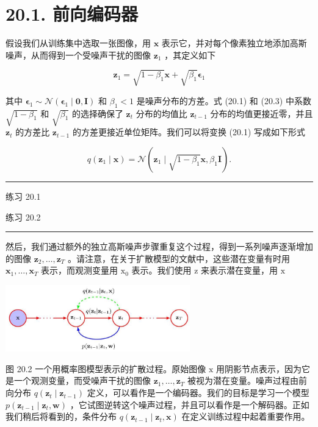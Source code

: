 \documentclass[10pt]{article}
\newcommand{\HRule}{\begin{center}\rule{0.9\linewidth}{0.2mm}\end{center}}
\begin{document}
\section*{20.1. 前向编码器}

假设我们从训练集中选取一张图像，用 \(\mathbf{x}\) 表示它，并对每个像素独立地添加高斯噪声，从而得到一个受噪声干扰的图像 \({\mathbf{z}}_{1}\) ，其定义如下

\[
{\mathbf{z}}_{1} = \sqrt{1 - {\beta }_{1}}\mathbf{x} + \sqrt{{\beta }_{1}}{\mathbf{\epsilon }}_{1} \tag{20.1}
\]

其中 \({\mathbf{\epsilon }}_{1} \sim  \mathcal{N}\left( {{\mathbf{\epsilon }}_{1} \mid  \mathbf{0},\mathbf{I}}\right)\) 和 \({\beta }_{1} < 1\) 是噪声分布的方差。式 (20.1) 和 (20.3) 中系数 \(\sqrt{1 - {\beta }_{1}}\) 和 \(\sqrt{{\beta }_{1}}\) 的选择确保了 \({\mathbf{z}}_{t}\) 分布的均值比 \({\mathbf{z}}_{t - 1}\) 分布的均值更接近零，并且 \({\mathbf{z}}_{t}\) 的方差比 \({\mathbf{z}}_{t - 1}\) 的方差更接近单位矩阵。我们可以将变换 (20.1) 写成如下形式

\[
q\left( {{\mathbf{z}}_{1} \mid  \mathbf{x}}\right)  = \mathcal{N}\left( {{\mathbf{z}}_{1} \mid  \sqrt{1 - {\beta }_{1}}\mathbf{x},{\beta }_{1}\mathbf{I}}\right) . \tag{20.2}
\]

\HRule

练习 20.1

练习 20.2

\HRule

然后，我们通过额外的独立高斯噪声步骤重复这个过程，得到一系列噪声逐渐增加的图像 \({\mathbf{z}}_{2},\ldots ,{\mathbf{z}}_{T}\) 。请注意，在关于扩散模型的文献中，这些潜在变量有时用 \({\mathbf{x}}_{1},\ldots ,{\mathbf{x}}_{T}\) 表示，而观测变量用 \({\mathrm{x}}_{0}\) 表示。我们使用 \(\mathrm{z}\) 来表示潜在变量，用 \(\mathrm{x}\)

\begin{center}
\includegraphics[max width=0.6\textwidth]{images/0194e279-9b28-703a-88f4-c3ac21e2010d_602_578_353_863_312_0.jpg}
\end{center}
\hspace*{3em} 

图 20.2 一个用概率图模型表示的扩散过程。原始图像 \(\mathrm{x}\) 用阴影节点表示，因为它是一个观测变量，而受噪声干扰的图像 \({\mathbf{z}}_{1},\ldots ,{\mathbf{z}}_{T}\) 被视为潜在变量。噪声过程由前向分布 \(q\left( {{\mathbf{z}}_{t} \mid  {\mathbf{z}}_{t - 1}}\right)\) 定义，可以看作是一个编码器。我们的目标是学习一个模型 \(p\left( {{\mathbf{z}}_{t - 1} \mid  {\mathbf{z}}_{t},\mathbf{w}}\right)\) ，它试图逆转这个噪声过程，并且可以看作是一个解码器。正如我们稍后将看到的，条件分布 \(q\left( {{\mathbf{z}}_{t - 1} \mid  {\mathbf{z}}_{t},\mathbf{x}}\right)\) 在定义训练过程中起着重要作用。
\end{document}
